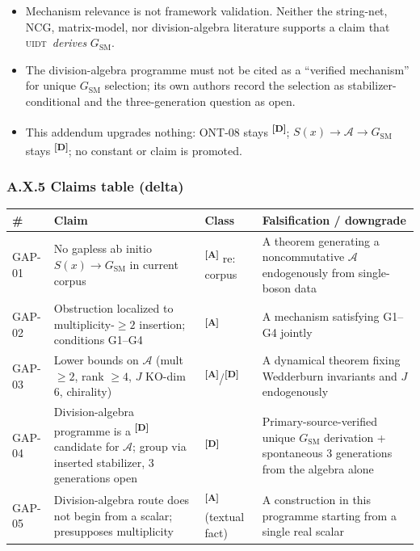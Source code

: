\documentclass[12pt,a4paper,twoside]{article}
\theoremstyle{plain}
\theoremstyle{definition}
\theoremstyle{remark}
\newcommand{\UIDT}{\textsc{uidt}}
\newcommand{\catmark}[1]{\textsuperscript{\textsf{\textbf{[#1]}}}}
\begin{document}
\begin{itemize}
\item Mechanism relevance is not framework validation. Neither the string-net, NCG, matrix-model, nor division-algebra literature supports a claim that \UIDT\ \emph{derives} $G_{\mathrm{SM}}$.
\item The division-algebra programme must not be cited as a ``verified mechanism'' for unique $G_{\mathrm{SM}}$ selection; its own authors record the selection as stabilizer-conditional and the three-generation question as open.
\item This addendum upgrades nothing: ONT-08 stays \catmark{D}; $S(x)\to\mathcal{A}\to G_{\mathrm{SM}}$ stays \catmark{D}; no constant or claim is promoted.
\end{itemize}

\subsubsection*{A.X.5 Claims table (delta)}

\begin{table}[h]
\centering
\begin{tabular}{|p{1.5cm}|p{6cm}|p{2cm}|p{5cm}|}
\hline
\textbf{\#} & \textbf{Claim} & \textbf{Class} & \textbf{Falsification / downgrade} \\
\hline
GAP-01 & No gapless ab initio $S(x)\to G_{\mathrm{SM}}$ in current corpus & \catmark{A} re: corpus & A theorem generating a noncommutative $\mathcal{A}$ endogenously from single-boson data \\
\hline
GAP-02 & Obstruction localized to multiplicity-$\geq2$ insertion; conditions G1--G4 & \catmark{A} & A mechanism satisfying G1--G4 jointly \\
\hline
GAP-03 & Lower bounds on $\mathcal{A}$ (mult $\geq2$, rank $\geq4$, $J$ KO-dim 6, chirality) & \catmark{A}/\catmark{D} & A dynamical theorem fixing Wedderburn invariants and $J$ endogenously \\
\hline
GAP-04 & Division-algebra programme is a \catmark{D} candidate for $\mathcal{A}$; group via inserted stabilizer, 3 generations open & \catmark{D} & Primary-source-verified unique $G_{\mathrm{SM}}$ derivation + spontaneous 3 generations from the algebra alone \\
\hline
GAP-05 & Division-algebra route does not begin from a scalar; presupposes multiplicity & \catmark{A} (textual fact) & A construction in this programme starting from a single real scalar \\
\hline
\end{tabular}
\end{table}
\end{document}
